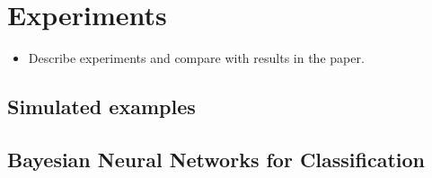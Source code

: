 
\section{Experiments}

\begin{itemize}
    \item Describe experiments and compare with results in the paper.
\end{itemize}

\subsection{Simulated examples}

\subsection{Bayesian Neural Networks for Classification}







